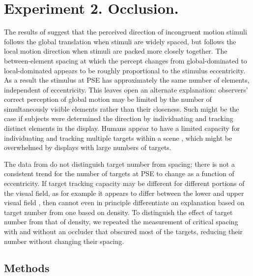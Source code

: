\documentclass[../manuscript]{subfiles}
\begin{document}
\section[Experiment 2]{Experiment 2. Occlusion.}
\label{sec:occlusion}




The results of  suggest that the perceived direction of incongruent motion stimuli follows the global translation when stimuli are widely spaced, but follows the local motion direction when stimuli are packed more closely together. The between-element spacing at which the percept changes from global-dominated to local-dominated appears to be roughly proportional to the stimulus eccentricity. As a result the stimulus at PSE has approximately the same number of elements, independent of eccentricity. This leaves open an alternate explanation: observers' correct perception of global motion may be limited by the number of simultaneously visible elements rather than their closeness. Such might be the case if subjects were determined the direction by individuating and tracking distinct elements in the display. Humans appear to have a limited capacity for individuating and tracking multiple targets within a scene \citep{Pylyshyn:1988fk}, which might be overwhelmed by displays with large numbers of targets.

The data from  do not distinguish target number from spacing; there is not a consistent trend for the number of targets at PSE to change as a function of eccentricity. If target tracking capacity may be different for different portions of the visual field, as for example it appears to differ between the lower and upper visual field \citep{He:1996rt}, then  cannot even in principle differentiate an explanation based on target number from one based on density. To distinguish the effect of target number from that of density, we repeated the measurement of critical spacing with and without an occluder that obscured most of the targets, reducing their number without changing their spacing.

\subsection{Methods}
\end{document}
